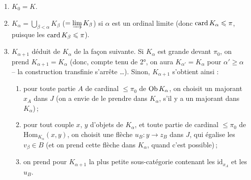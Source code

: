 \begin{enumerate}
\item[1°)] $K_0 = K$.
\item[2°)] $K_{\alpha} = \bigcup_{\beta < \alpha} K_{\beta}$ ($= \varinjlim K_{\beta}$) si $\alpha$ est un ordinal limite (donc $\operatorname{card} K_{\alpha} \leqslant \pi$, puisque les $\operatorname{card} K_{\beta} \leqslant \pi$).
\item[3°)] $K_{\alpha+1}$ déduit de $K_{\alpha}$ de la façon suivante. Si $K_{\alpha}$ est grande devant $\pi_0$, on prend $K_{\alpha+1} = K_{\alpha}$ (donc, compte tenu de 2°, on aura $K_{\alpha'} = K_{\alpha}$ pour $\alpha' \geqslant \alpha$ -- la construction transfinie s’arrête \ldots). Sinon, $K_{\alpha+1}$ s’obtient ainsi :
\begin{enumerate}
\item[a)] pour toute partie $A$ de cardinal $\leqslant \pi_0$ de $\operatorname{Ob} K_{\alpha}$, on choisit un majorant $x_A$ dans $J$ (on a envie de le prendre dans $K_{\alpha}$, s’il y a un majorant dans $K_{\alpha}$)\,;
\item[b)] pour tout couple $x$, $y$ d’objets de $K_{\alpha}$, et toute partie de cardinal $\leqslant \pi_0$ de $\mathrm{Hom}_{K_{\alpha}}(x,y)$, on choisit une flèche $u_B : y \longrightarrow z_B$ dans $J$, qui égalise les $v_{\beta} \in B$ (et on prend cette flèche dans $K_{\alpha}$, quand c’est possible)\,;
\item[c)] on prend pour $K_{\alpha+1}$ la plus petite sous-catégorie contenant les $\mathrm{id}_{x_A}$ et les $u_B$.
\end{enumerate}
\end{enumerate}


